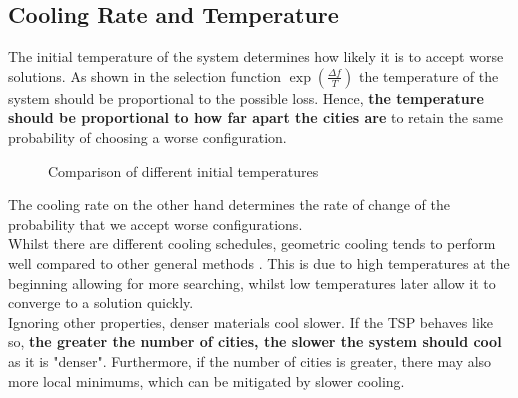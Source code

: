 \documentclass{article}
\begin{document}
\subsection{Cooling Rate and Temperature}

The initial temperature of the system determines how likely it is to accept worse solutions.
As shown in the selection function $\exp(\frac{\Delta f}{T})$ the temperature of the system should be proportional to the possible loss.
Hence, \textbf{the temperature should be proportional to how far apart the cities are} to retain the same probability of choosing a worse configuration.

\begin{figure}[H]
    \centering
    \caption{Comparison of different initial temperatures}
\end{figure}


The cooling rate on the other hand determines the rate of change of the probability that we accept worse configurations.
\\

Whilst there are different cooling schedules, geometric cooling tends to perform well compared to other general methods \cite{cooling}.
This is due to high temperatures at the beginning allowing for more searching, whilst low temperatures later allow it to converge to a solution quickly.
\\

Ignoring other properties, denser materials cool slower.
If the TSP behaves like so, \textbf{the greater the number of cities, the slower the system should cool} as it is "denser".
Furthermore, if the number of cities is greater, there may also more local minimums, which can be mitigated by slower cooling.
\end{document}
